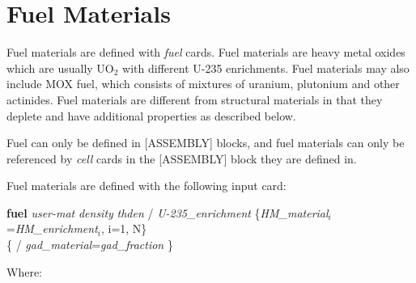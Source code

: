 \section{Fuel Materials}

Fuel materials are defined with {\it fuel} cards.
Fuel materials are heavy metal oxides which are usually UO$_2$ with different U-235 enrichments.
Fuel materials may also include MOX fuel, which consists of mixtures of uranium, plutonium and other actinides.
Fuel materials are different from structural materials in that they deplete and have
additional properties as described below.

Fuel can only be defined in [ASSEMBLY] blocks, and fuel materials can only be referenced by {\it cell} cards
in the [ASSEMBLY] block they are defined in.

Fuel materials are defined with the following input card:

{\bf fuel} {\it user-mat} {\it density} {\it thden} / {\it U-235\_enrichment}
    \{{\it HM\_material$_i$}={\it HM\_enrichment$_i$}, i=1, N\}  \\
   \{ / {\it gad\_material}={\it gad\_fraction} \}

Where:

